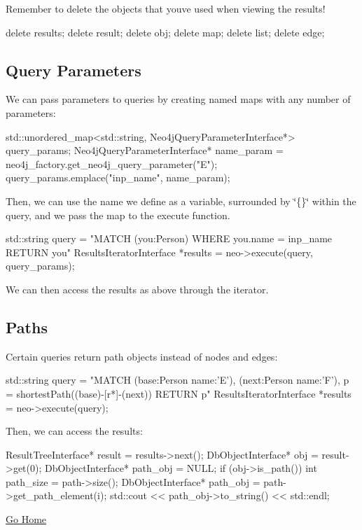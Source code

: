 Remember to delete the objects that you\textquotesingle{}ve used when viewing the results! \begin{DoxyVerb}delete results;
delete result;
delete obj;
delete map;
delete list;
delete edge;
\end{DoxyVerb}


\subsection*{Query Parameters}

We can pass parameters to queries by creating named maps with any number of parameters\+: \begin{DoxyVerb}std::unordered_map<std::string, Neo4jQueryParameterInterface*> query_params;
Neo4jQueryParameterInterface* name_param = neo4j_factory.get_neo4j_query_parameter("E");
query_params.emplace("inp_name", name_param);
\end{DoxyVerb}


Then, we can use the name we define as a variable, surrounded by \char`\"{}\{\}\char`\"{} within the query, and we pass the map to the execute function. \begin{DoxyVerb}std::string query = "MATCH (you:Person) WHERE you.name = {inp_name} RETURN you"
ResultsIteratorInterface *results = neo->execute(query, query_params);
\end{DoxyVerb}


We can then access the results as above through the iterator.

\subsection*{Paths}

Certain queries return path objects instead of nodes and edges\+: \begin{DoxyVerb}std::string query = "MATCH (base:Person {name:'E'}), (next:Person {name:'F'}), p = shortestPath((base)-[r*]-(next)) RETURN p"
ResultsIteratorInterface *results = neo->execute(query);
\end{DoxyVerb}


Then, we can access the results\+: \begin{DoxyVerb}ResultTreeInterface* result = results->next();
DbObjectInterface* obj = result->get(0);
DbObjectInterface* path_obj = NULL;
if (obj->is_path()) {
  int path_size = path->size();
  DbObjectInterface* path_obj = path->get_path_element(i);
  std::cout << path_obj->to_string() << std::endl;
}
\end{DoxyVerb}


\hyperlink{index}{Go Home} 